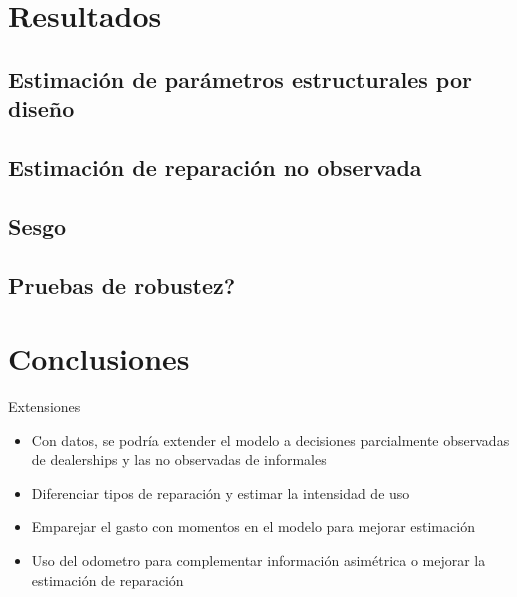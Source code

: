 \documentclass{article}
\begin{document}
\section{Resultados}

\subsection{Estimación de parámetros estructurales por diseño}


\subsection{Estimación de reparación no observada}


\subsection{Sesgo}

\subsection{Pruebas de robustez?}


\section{Conclusiones}


Extensiones
\begin{itemize}
    \item Con datos, se podría extender el modelo a decisiones parcialmente observadas de dealerships y las no observadas de informales
    \item Diferenciar tipos de reparación y estimar la intensidad de uso
    \item Emparejar el gasto con momentos en el modelo para mejorar estimación
    \item Uso del odometro para complementar información asimétrica o mejorar la estimación de reparación
\end{itemize}




\printbibliography[title={Referencias}]
\end{document}
